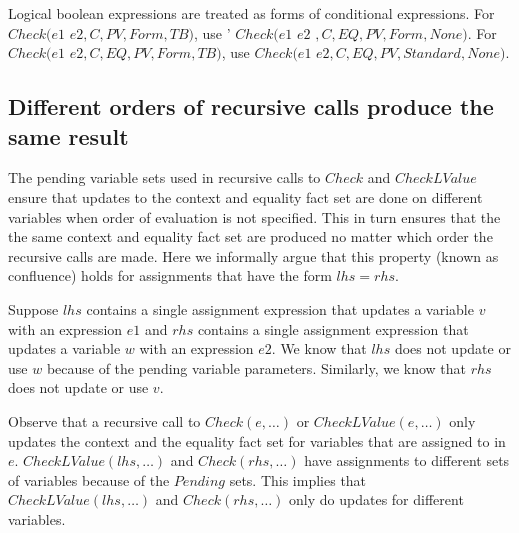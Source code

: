 Logical boolean expressions are treated as forms of conditional expressions.
For  $Check(e1$ \code{&&} $ e2, C, PV, Form, TB)$, use '
$Check(e1$  $e2$ $, C, EQ, PV, Form, None)$.  
For $Check(e1$ \code{ \|\| } $ e2, C, EQ, PV, Form, TB)$,  use 
$Check(e1 $  $e2, C, EQ, PV, Standard, None)$.

\subsection{Different orders of recursive calls produce the same result}

The pending variable sets used in recursive calls to $Check$ and $CheckLValue$
ensure that updates to the context and equality fact set are done on different variables when order
of evaluation is not specified.  This in turn ensures that the the same context and equality fact
set are produced no matter which order the recursive calls are made.   Here we informally argue 
that this property (known as confluence) holds for assignments that have  the form $lhs = rhs$.

Suppose $lhs$
contains a single assignment expression that updates a variable $v$ with an expression $e1$ and 
$rhs$ contains a single assignment expression that updates  a variable $w$ with an expression $e2$.  
We know that $lhs$ does not update or use $w$ because of the pending variable parameters.  Similarly, 
we know that $rhs$ does not update or use $v$.

Observe that a recursive call to $Check(e, \ldots)$ or $CheckLValue(e, \ldots)$  only updates the context
and the equality fact set for variables that are assigned to in $e$.   $CheckLValue(lhs,\ldots)$ and
$Check(rhs, \ldots)$ have assignments to different sets of variables because of the $Pending$ sets.  This
implies that $CheckLValue(lhs,\ldots)$ and $Check(rhs, \ldots)$ only do updates for different variables.

